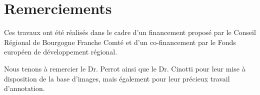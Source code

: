 \documentclass{gretsi}
\begin{document}
\begin{sloppypar}
\section*{Remerciements}
Ces travaux ont été réalisés dans le cadre d'un financement proposé par le Conseil Régional de Bourgogne Franche Comté et d'un co-financement par le Fonds européen de développement régional.\par
Nous tenons à remercier le Dr. Perrot ainsi que le Dr. Cinotti pour leur mise à disposition de la base d'images, mais également pour leur précieux travail d'annotation.



\end{sloppypar}
\end{document}
